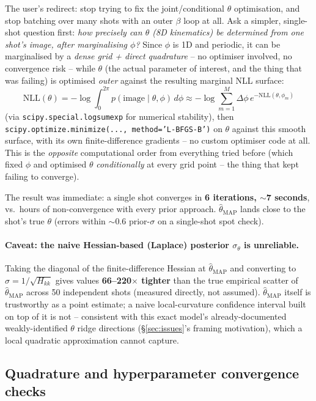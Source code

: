 \documentclass[11pt,a4paper]{article}
\newcommand{\code}[1]{\texttt{#1}}
\begin{document}
The user's redirect: stop trying to fix the joint/conditional $\theta$
optimisation, and stop batching over many shots with an outer $\beta$ loop
at all. Ask a simpler, single-shot question first: \emph{how precisely can
$\theta$ (8D kinematics) be determined from one shot's image, after
marginalising $\phi$?} Since $\phi$ is 1D and periodic, it can be
marginalised by a \emph{dense grid + direct quadrature} -- no optimiser
involved, no convergence risk -- while $\theta$ (the actual parameter of
interest, and the thing that was failing) is optimised \emph{outer}
against the resulting marginal NLL surface:
\[
  \mathrm{NLL}(\theta) = -\log\!\int_0^{2\pi} p(\text{image}\mid\theta,\phi)\,d\phi
  \approx -\log\!\sum_{m=1}^M \Delta\phi\, e^{-\mathrm{NLL}(\theta,\phi_m)}
\]
(via \code{scipy.special.logsumexp} for numerical stability), then
\code{scipy.optimize.minimize(..., method='L-BFGS-B')} on $\theta$ against
this smooth surface, with its own finite-difference gradients -- no custom
optimiser code at all. This is the \emph{opposite} computational order
from everything tried before (which fixed $\phi$ and optimised $\theta$
\emph{conditionally} at every grid point -- the thing that kept failing to
converge).

The result was immediate: a single shot converges in \textbf{6 iterations,
$\sim$7 seconds}, vs.\ hours of non-convergence with every prior approach.
$\hat\theta_{\mathrm{MAP}}$ lands close to the shot's true $\theta$ (errors
within $\sim$0.6 prior-$\sigma$ on a single-shot spot check).

\paragraph{Caveat: the naive Hessian-based (Laplace) posterior $\sigma_\theta$
is unreliable.} Taking the diagonal of the finite-difference Hessian at
$\hat\theta_{\mathrm{MAP}}$ and converting to $\sigma=1/\sqrt{H_{kk}}$ gives
values \textbf{66--220$\times$ tighter} than the true empirical scatter of
$\hat\theta_{\mathrm{MAP}}$ across 50 independent shots (measured directly,
not assumed). $\hat\theta_{\mathrm{MAP}}$ itself is trustworthy as a point
estimate; a naive local-curvature confidence interval built on top of it is
not -- consistent with this exact model's already-documented
weakly-identified $\theta$ ridge directions (\S\ref{sec:issues}'s framing
motivation), which a local quadratic approximation cannot capture.

\subsection{Quadrature and hyperparameter convergence checks}
\label{sec:2026-07-20-convergence}
\end{document}
